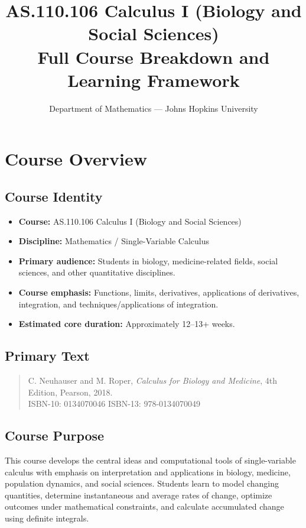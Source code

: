 \documentclass[11pt]{article}
\title{\textbf{AS.110.106 Calculus I (Biology and Social Sciences)}\\
\large Full Course Breakdown and Learning Framework}
\author{Department of Mathematics --- Johns Hopkins University}
\date{}
\begin{document}
\maketitle

\section{Course Overview}

\subsection{Course Identity}

\begin{itemize}
    \item \textbf{Course:} AS.110.106 Calculus I (Biology and Social Sciences)
    \item \textbf{Discipline:} Mathematics / Single-Variable Calculus
    \item \textbf{Primary audience:} Students in biology, medicine-related fields, social sciences, and other quantitative disciplines.
    \item \textbf{Course emphasis:} Functions, limits, derivatives, applications of derivatives, integration, and techniques/applications of integration.
    \item \textbf{Estimated core duration:} Approximately 12--13+ weeks.
\end{itemize}

\subsection{Primary Text}

\begin{quote}
C. Neuhauser and M. Roper, \textit{Calculus for Biology and Medicine}, 4th Edition, Pearson, 2018.\\
ISBN-10: 0134070046 \qquad ISBN-13: 978-0134070049
\end{quote}

\subsection{Course Purpose}

This course develops the central ideas and computational tools of single-variable calculus with emphasis on interpretation and applications in biology, medicine, population dynamics, and social sciences. Students learn to model changing quantities, determine instantaneous and average rates of change, optimize outcomes under mathematical constraints, and calculate accumulated change using definite integrals.
\end{document}
